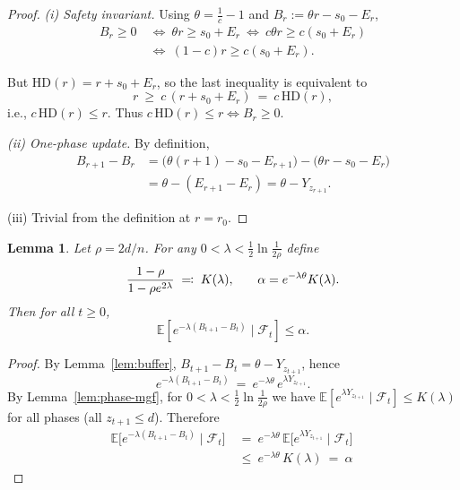 \documentclass[lettersize,journal]{IEEEtran}
\newcommand{\EE}{\mathbb{E}}
\newcommand{\HD}{\text{HD}}
\newtheorem{lemma}{Lemma}
\begin{document}
{\begin{proof}
	\smallskip
	\emph{(i) Safety invariant.}
	Using $\theta=\tfrac{1}{c}-1$ and $B_r:=\theta r - s_0 - E_r$,
	\begin{align*}
		B_r\ge 0
		\ &\Longleftrightarrow\
		\theta r \ge s_0+E_r
		\ \Longleftrightarrow\
		c\theta r \ge c(s_0+E_r)
		\\ &\Longleftrightarrow\
		(1-c)r \ge c(s_0+E_r).	
	\end{align*}
	
	
	But $\HD(r)=r+s_0+E_r$, so the last inequality is equivalent to
	\[
	r \ \ge\ c\,(r+s_0+E_r)\ =\ c\,\HD(r),
	\]
	i.e., $c\,\HD(r)\le r$. Thus $c\,\HD(r)\le r \iff B_r\ge 0$.
	
	\smallskip
	\emph{(ii) One-phase update.}
	By definition,
	\begin{align*}
		B_{r+1}-B_r
		&= \bigl(\theta(r+1)-s_0-E_{r+1}\bigr) - \bigl(\theta r - s_0 - E_r\bigr)
		\\&= \theta - (E_{r+1}-E_r)
		= \theta - Y_{z_{r+1}}.
	\end{align*}
	
	
	
	\smallskip
	(iii) Trivial from the definition at $r=r_0$.
\end{proof}

\setcounter{theorem}{7}
\begin{lemma}
	Let $\rho=2d/n$.  
	For any $0<\lambda<\tfrac12\ln\tfrac{1}{2\rho}$ define
	\[
	\textcolor{black}{\frac{1-\rho}{1-\rho e^{2\lambda}} \;\eqqcolon\; K(\lambda),}
	\qquad 
	\alpha=e^{-\lambda\theta}K(\lambda).
	\]
	Then for all $t\ge0$,
	\[
	\EE[e^{-\lambda(B_{t+1}-B_t)}\mid\mathcal{F}_t]\le \alpha.
	\]
\end{lemma}

\begin{proof}
	By Lemma~\ref{lem:buffer}, $B_{t+1}-B_t=\theta-Y_{z_{t+1}}$, hence
	\[
	e^{-\lambda(B_{t+1}-B_t)}\ =\ e^{-\lambda\theta}\,e^{\lambda Y_{z_{t+1}}}.
	\]
	By Lemma~\ref{lem:phase-mgf}, for $0<\lambda<\tfrac12\ln\!\tfrac{1}{2\rho}$ we have $\EE[e^{\lambda Y_{z_{t+1}}}\mid\mathcal F_t]\le K(\lambda)$ for all phases (all $z_{t+1}\le d$). Therefore
	\begin{align*}
		\EE\!\big[e^{-\lambda(B_{t+1}-B_t)}\mid \mathcal F_t\big]
		\ &=\ e^{-\lambda\theta}\,\EE\!\big[e^{\lambda Y_{z_{t+1}}}\mid\mathcal F_t\big]
		\ \\ &\le\ e^{-\lambda\theta}\,K(\lambda)
		\ =\ \alpha	
	\end{align*}
\end{proof}


}
\end{document}
